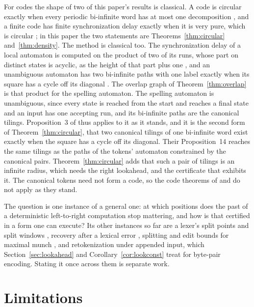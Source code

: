 \documentclass[11pt,a4paper]{article}
\theoremstyle{definition}
\theoremstyle{plain}
\begin{document}
For codes the shape of two of this paper's results is classical. A code is circular exactly when every periodic
bi-infinite word has at most one decomposition \citep[Proposition~2.9]{devolder1992finitary}, and a finite code has
finite synchronization delay exactly when it is very pure, which is circular \citep{restivo1975synchronization}; in this
paper the two statements are Theorems~\ref{thm:circular} and~\ref{thm:density}. The method is classical too. The
synchronization delay of a local automaton is computed on the product of two of its runs, whose part on distinct states
is acyclic, as the height of that part plus one \citep[Section~1]{beal1998synchronization}, and an unambiguous automaton
has two bi-infinite paths with one label exactly when its square has a cycle off its diagonal
\citep[Proposition~3]{beal2024unambiguously}. The overlap graph of Theorem~\ref{thm:overlap} is that product for the
spelling automaton. The spelling automaton is unambiguous, since every state is reached from the start and reaches a
final state and an input has one accepting run, and its bi-infinite paths are the canonical tilings. Proposition~3 of
\citet{beal2024unambiguously} thus applies to it as it stands, and it is the second form of Theorem~\ref{thm:circular},
that two canonical tilings of one bi-infinite word exist exactly when the square has a cycle off its diagonal. Their
Proposition~14 reaches the same tilings as the paths of the tokens' automaton constrained by the canonical pairs.
Theorem~\ref{thm:circular} adds that such a pair of tilings is an infinite radius, which needs the right lookahead, and
the certificate that exhibits it. The canonical tokens need not form a code, so the code theorems of
\citet{devolder1992finitary} and \citet{restivo1975synchronization} do not apply as they stand.

The question is one instance of a general one: at which positions does the past of a deterministic left-to-right
computation stop mattering, and how is that certified in a form one can execute? Its other instances so far are a
lexer's split points and split windows \citep{nidhogg2026splitpoints,nidhogg2026splitwindows}, recovery after a lexical
error \citep{nidhogg2026panicmode}, splitting and edit bounds for maximal munch \citep{nidhogg2026splitting}, and
retokenization under appended input, which Section~\ref{sec:lookahead} and Corollary~\ref{cor:lookconst} treat for
byte-pair encoding. Stating it once across them is separate work.

\section{Limitations}\label{sec:limitations}
\end{document}
